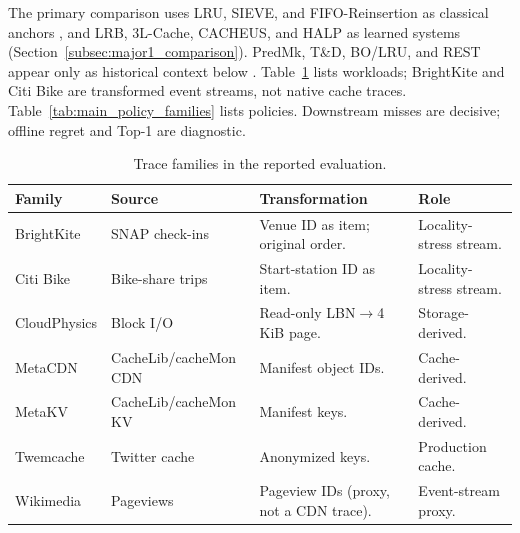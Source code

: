 \documentclass[preprint,12pt]{elsarticle}
\begin{document}
The primary comparison uses LRU, SIEVE, and FIFO-Reinsertion as classical anchors \cite{belady1966replacement_algorithms,fiat1991competitive_paging,zhang2024sieve}, and LRB, 3L-Cache, CACHEUS, and HALP as learned systems \cite{song2020lrb,zhou2025threelcache,rodriguez2021cacheus,song2023halp} (Section~\ref{subsec:major1_comparison}). PredMk, T\&D, BO/LRU, and REST appear only as historical context below \cite{lykouris2021competitive_caching,antoniadis2020online_metric_untrusted,wei2020better_simpler_lac}. Table~\ref{tab:trace_families} lists workloads; BrightKite and Citi Bike are transformed event streams, not native cache traces. Table~\ref{tab:main_policy_families} lists policies. Downstream misses are decisive; offline regret and Top-1 are diagnostic.

\begin{table}[!htbp]
\centering
\caption{Trace families in the reported evaluation.}
\label{tab:trace_families}
\renewcommand{\arraystretch}{1.15}
\small
\begin{tabular}{@{}>{\raggedright\arraybackslash}p{2.1cm}>{\raggedright\arraybackslash}p{3.4cm}>{\raggedright\arraybackslash}p{3.6cm}>{\raggedright\arraybackslash}p{2.4cm}@{}}
\toprule
Family & Source & Transformation & Role \\
\midrule
BrightKite & SNAP check-ins \cite{cho2011friendship_mobility} & Venue ID as item; original order. & Locality-stress stream. \\[2pt]
Citi Bike & Bike-share trips \cite{citibike_system_data} & Start-station ID as item. & Locality-stress stream. \\[2pt]
CloudPhysics & Block I/O \cite{cachemon_open_source_cache_dataset} & Read-only LBN$\to$4\,KiB page. & Storage-derived. \\[2pt]
MetaCDN & CacheLib/cacheMon CDN \cite{cachemon_open_source_cache_dataset} & Manifest object IDs. & Cache-derived. \\[2pt]
MetaKV & CacheLib/cacheMon KV \cite{cachemon_open_source_cache_dataset} & Manifest keys. & Cache-derived. \\[2pt]
Twemcache & Twitter cache \cite{twitter_cache_trace,yang2020twitter_cache_clusters} & Anonymized keys. & Production cache. \\[2pt]
Wikimedia & Pageviews \cite{wikimedia_pageviews} & Pageview IDs (proxy, not a CDN trace). & Event-stream proxy. \\
\bottomrule
\end{tabular}
\end{table}
\end{document}
